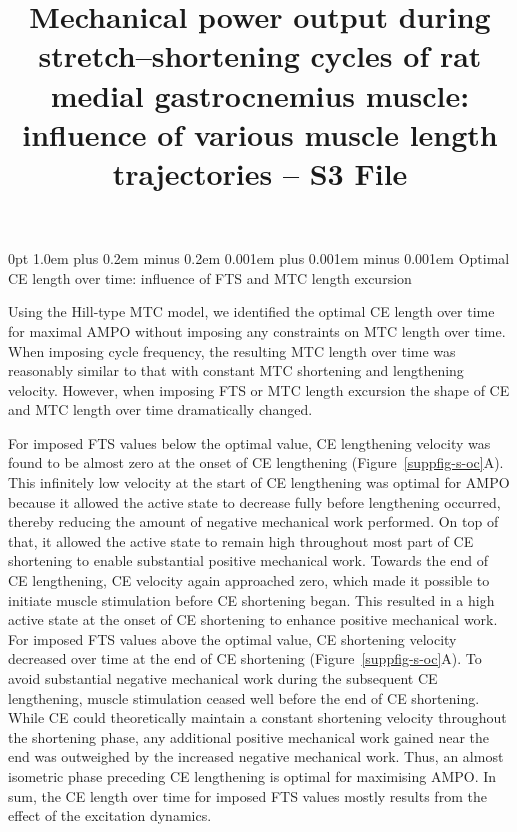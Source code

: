\documentclass[
  11pt,
  a4paper]{article}
\title{Mechanical power output during stretch--shortening cycles of rat
medial gastrocnemius muscle: influence of various muscle length
trajectories -- S3 File}
\author{}
\date{}
\makeatletter
\renewcommand{\section}{%
  \@startsection{section}{1}
    {0pt} 					%
    {1.0em plus 0.2em minus 0.2em} 	%
    {0.001em plus 0.001em minus 0.001em}    	%
    {\Large\bfseries\sffamily}%
}
\newcommand*\quartosuppfigref[1]{Figure \hyperref[#1]{S\ref{#1}}}
\makeatother
\begin{document}
\linenumbers

\renewcommand{\thesection}{S\arabic{section}}
\setcounter{section}{2}
\renewcommand{\thesuppfig}{\thesection.\arabic{suppfig}}
\renewcommand*\quartosuppfigref[1]{Figure~\ref{#1}}


\section{Optimal CE length over time: influence of FTS and MTC length
excursion}\label{optimal-ce-length-over-time-influence-of-fts-and-mtc-length-excursion}

Using the Hill-type MTC model, we identified the optimal CE length over
time for maximal AMPO without imposing any constraints on MTC length
over time. When imposing cycle frequency, the resulting MTC length over
time was reasonably similar to that with constant MTC shortening and
lengthening velocity. However, when imposing FTS or MTC length excursion
the shape of CE and MTC length over time dramatically changed.

For imposed FTS values below the optimal value, CE lengthening velocity
was found to be almost zero at the onset of CE lengthening
(\quartosuppfigref{suppfig-s-oc}A). This infinitely low velocity at the
start of CE lengthening was optimal for AMPO because it allowed the
active state to decrease fully before lengthening occurred, thereby
reducing the amount of negative mechanical work performed. On top of
that, it allowed the active state to remain high throughout most part of
CE shortening to enable substantial positive mechanical work. Towards
the end of CE lengthening, CE velocity again approached zero, which made
it possible to initiate muscle stimulation before CE shortening began.
This resulted in a high active state at the onset of CE shortening to
enhance positive mechanical work. For imposed FTS values above the
optimal value, CE shortening velocity decreased over time at the end of
CE shortening (\quartosuppfigref{suppfig-s-oc}A). To avoid substantial
negative mechanical work during the subsequent CE lengthening, muscle
stimulation ceased well before the end of CE shortening. While CE could
theoretically maintain a constant shortening velocity throughout the
shortening phase, any additional positive mechanical work gained near
the end was outweighed by the increased negative mechanical work. Thus,
an almost isometric phase preceding CE lengthening is optimal for
maximising AMPO. In sum, the CE length over time for imposed FTS values
mostly results from the effect of the excitation dynamics.
\end{document}
